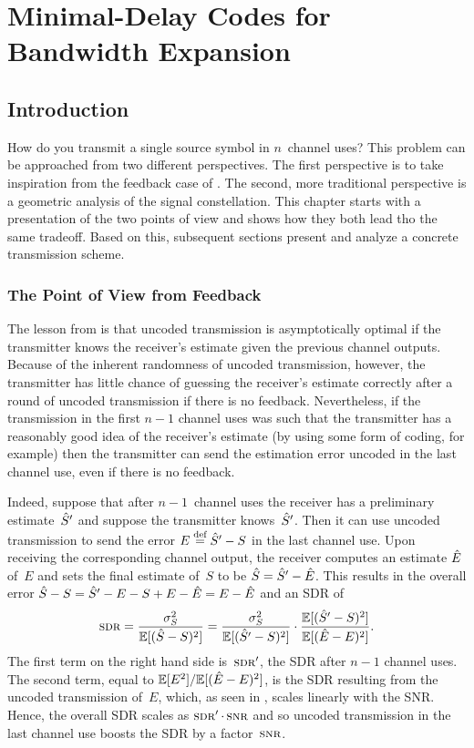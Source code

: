 \chapter{Minimal-Delay Codes for Bandwidth Expansion}

\section{Introduction}\label{sec:mindelintro}

How do you transmit a single source symbol in $n$~channel uses? This problem can
be approached from two different perspectives.  The first perspective is to take
inspiration from the feedback case of . The second, more
traditional perspective is a geometric analysis of the signal constellation.
This chapter starts with a presentation of the two points of view and shows how
they both lead tho the same tradeoff. Based on this, subsequent sections present
and analyze a concrete transmission scheme. 


\subsection{The Point of View from Feedback}

The lesson from  is that uncoded transmission is asymptotically
optimal if the transmitter knows the receiver's estimate given the previous
channel outputs.  Because of the inherent randomness of uncoded transmission,
however, the transmitter has little chance of guessing the receiver's estimate
correctly after a round of uncoded transmission if there is no feedback.
Nevertheless, if the transmission in the first $n-1$ channel uses was such that
the transmitter has a reasonably good idea of the receiver's estimate (by using
some form of coding, for example) then the transmitter can send the estimation
error uncoded in the last channel use, even if there is no feedback. 

Indeed, suppose that after $n-1$~channel uses the receiver has a preliminary
estimate~${\hat{S}}'$ and suppose the transmitter knows~${\hat{S}}'$. Then it 
can use uncoded transmission to send the error $E \stackrel{\text{def}}{=} {\hat{S}}' - S$ in the last
channel use. Upon receiving the corresponding channel output, the receiver
computes an estimate $\hat{E}$ of~$E$ and sets the final estimate of~$S$ to be ${\hat{S}}
= {\hat{S}}' - \hat{E}$. This results in the overall error ${\hat{S}} - S = {\hat{S}}' - E - S + E -
\hat{E} = E - \hat{E}$ and an SDR of
\begin{equation*}
  \sdr = \frac{\ssq}{\mse} = \frac{\ssq}{\E[(\Sh' - S)^2]} \cdot
  \frac{\E[(\Sh' - S)^2]}{\msee}.
\end{equation*}
The first term on the right hand side is~$\sdr'$, the SDR after $n-1$ channel
uses. The second term, equal to $\mathbb{E}[E^2]/{\mathbb{E}[(\hat{E} - E)^2]}$, is the SDR resulting from the
uncoded transmission of~$E$, which, as seen in , scales
linearly with the SNR. Hence, the overall SDR scales as $\sdr' \cdot \snr$ and
so uncoded transmission in the last channel use boosts the SDR by a
factor~$\snr$. 

